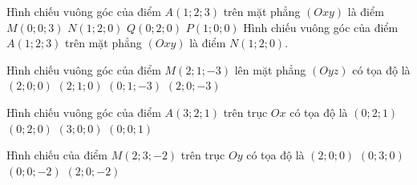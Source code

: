 \begin{ex}
	Hình chiếu vuông góc của điểm $A(1;2;3)$ trên mặt phẳng $(Oxy)$ là điểm
	\choice
	{$M(0;0;3)$}
	{\True $N(1;2;0)$}
	{$Q(0;2;0)$}
	{$P(1;0;0)$}
	\loigiai
	{
		Hình chiếu vuông góc của điểm $A(1;2;3)$ trên mặt phẳng $(Oxy)$ là điểm $N(1;2;0)$.
	}
\end{ex} 

\begin{ex}
	Hình chiếu vuông góc của điểm $M(2;1;-3)$ lên mặt phẳng $(Oyz)$ có tọa độ là
	\choice
	{$(2;0;0)$}
	{$(2;1;0)$}
	{\True $(0;1;-3)$}
	{$(2;0;-3)$}
\end{ex} 

\begin{ex}
	Hình chiếu vuông góc của điểm $A(3;2;1)$ trên trục $Ox$ có tọa độ là
	\choice
	{$(0;2;1)$}
	{$(0;2;0)$}
	{\True $(3;0;0)$}
	{$(0;0;1)$}
\end{ex} 

\begin{ex}
	Hình chiếu của điểm $M(2;3;-2)$ trên trục $Oy$ có tọa độ là
	\choice
	{$ (2;0;0) $}
	{\True $ (0;3;0) $}
	{$ (0;0;-2) $}
	{$ (2;0;-2) $}
\end{ex} 

